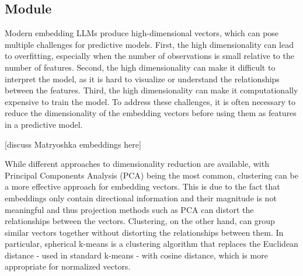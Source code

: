 \documentclass[article]{jss}
\begin{document}
\subsection[cluster Module]{ Module}\label{subsec:module-cluster}

Modern embedding LLMs produce high-dimensional vectors, which can pose multiple challenges for predictive models. First, the high dimensionality can lead to overfitting, especially when the number of observations is small relative to the number of features. Second, the high dimensionality can make it difficult to interpret the model, as it is hard to visualize or understand the relationships between the features. Third, the high dimensionality can make it computationally expensive to train the model. To address these challenges, it is often necessary to reduce the dimensionality of the embedding vectors before using them as features in a predictive model.

[discuss Matryoshka embeddings here]

While different approaches to dimensionality reduction are available, with Principal Components Analysis (PCA) being the most common, clustering can be a more effective approach for embedding vectors. This is due to the fact that embeddings only contain directional information and their magnitude is not meaningful and thus projection methods such as PCA can distort the relationships between the vectors. Clustering, on the other hand, can group similar vectors together without distorting the relationships between them. In particular, spherical k-means is a clustering algorithm that replaces the Euclidean distance - used in standard k-means - with cosine distance, which is more appropriate for normalized vectors.
\end{document}
